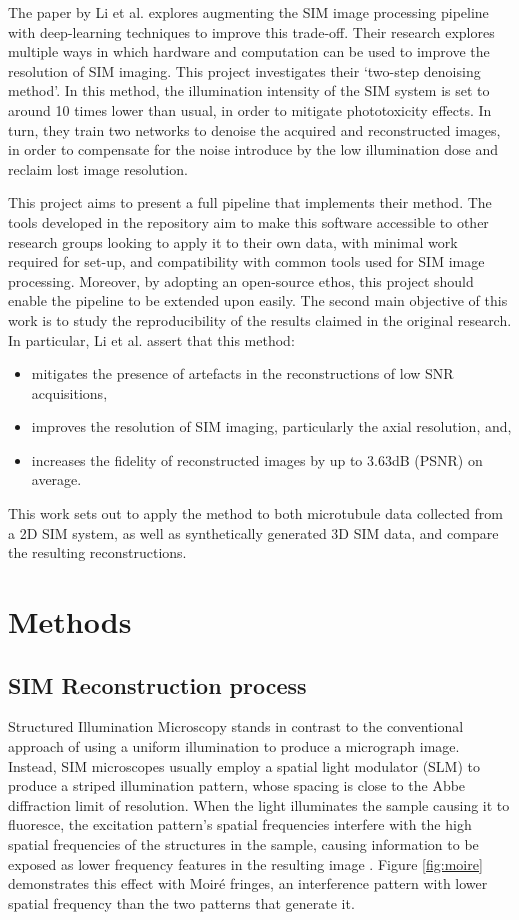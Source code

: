 \documentclass[12pt]{article}
\begin{document}
The paper by Li et al. \cite{keypaper} explores augmenting the SIM image processing pipeline with deep-learning techniques to improve this trade-off.
Their research explores multiple ways in which hardware and computation can be used to improve the resolution of SIM imaging.
This project investigates their `two-step denoising method'.
In this method, the illumination intensity of the SIM system is set to around 10 times lower than usual,
in order to mitigate phototoxicity effects.
In turn, they train two networks to denoise the acquired and reconstructed images,
in order to compensate for the noise introduce by the low illumination dose and reclaim lost image resolution.

This project aims to present a full pipeline that implements their method.
The tools developed in the repository aim to make this software accessible to other research groups looking to apply it to their own data,
with minimal work required for set-up, and compatibility with common tools used for SIM image processing.
Moreover, by adopting an open-source ethos, this project should enable the pipeline to be extended upon easily.
The second main objective of this work is to study the reproducibility of the results claimed in the original research.
In particular, Li et al. assert that this method:
\begin{itemize}
    \item mitigates the presence of artefacts in the reconstructions of low SNR acquisitions,
    \item improves the resolution of SIM imaging, particularly the axial resolution, and,
    \item increases the fidelity of reconstructed images by up to 3.63dB (PSNR) on average.
\end{itemize}
This work sets out to apply the method to both microtubule data collected from a 2D SIM system,
as well as synthetically generated 3D SIM data, and compare the resulting reconstructions.

\section{Methods}

\subsection{SIM Reconstruction process}


Structured Illumination Microscopy stands in contrast to the conventional approach of using a uniform illumination to produce a micrograph image.
Instead, SIM microscopes usually employ a spatial light modulator (SLM) to produce a striped illumination pattern,
whose spacing is close to the Abbe diffraction limit of resolution.
When the light illuminates the sample causing it to fluoresce,
the excitation pattern's spatial frequencies interfere with the high spatial frequencies of the structures in the sample,
causing information to be exposed as lower frequency features in the resulting image \cite{originalSIM}.
Figure \ref{fig:moire} demonstrates this effect with Moir\'{e} fringes,
an interference pattern with lower spatial frequency than the two patterns that generate it.
\end{document}
